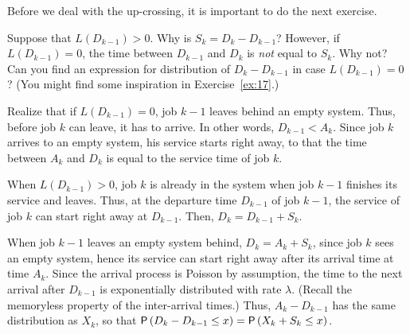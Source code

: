 Before we deal with the up-crossing, it is important to do the next exercise.
\begin{exercise} Suppose that $L(D_{k-1})>0$. Why is
  $S_k = D_k - D_{k-1}$?  However, if $L(D_{k-1}) = 0$, the time between
  $D_{k-1}$ and $D_k$ is \emph{not} equal to $S_k$. Why not? Can you find an expression for
  distribution of $D_k-D_{k-1}$ in case $L(D_{k-1})=0$? (You might find some inspiration in Exercise~\ref{ex:17}.)
  \begin{hint}
Realize that if $L(D_{k-1})=0$, job $k-1$ leaves behind an empty
  system. Thus, before job $k$ can leave, it has to arrive. In other
  words, $D_{k-1}<A_k$.  Since job $k$ arrives to an empty system,
  his service starts right away, to that the time between $A_k$ and
  $D_k$ is equal to the service time of job $k$.
  \end{hint}
\begin{solution}
  When $L(D_{k-1})>0$, job $k$ is already in the system when job $k-1$
  finishes its service and leaves. Thus, at the departure time
  $D_{k-1}$ of job $k-1$, the service of job $k$ can start right away
  at $D_{k-1}$. Then, $D_k=D_{k-1}+S_k$.


    When job $k-1$ leaves an empty system behind, $D_k= A_k + S_k$,
    since job $k$ sees an empty system, hence its service can start
    right away after its arrival time at time $A_k$. Since the arrival
    process is Poisson by assumption, the time to the next arrival
    after $D_{k-1}$ is exponentially distributed with rate
    $\lambda$. (Recall the memoryless property of the inter-arrival
    times.) Thus, $A_k - D_{k-1}$ has the same distribution as $X_k$,
    so that $\P{D_k - D_{k-1} \leq x} = \P{X_k + S_k\leq x}$. 
\end{solution}
\end{exercise}

